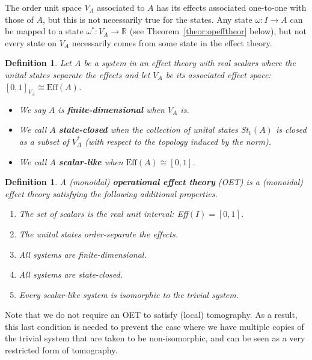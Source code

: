 \documentclass[b5paper,onecolumn,12pt,accepted=2019-05-03, issue=1, volume=1, shorttitle=papers/compositionality-1-1]{compositionalityarticle}
\newcounter{counter}
\numberwithin{counter}{section}
\newtheorem{definition}[counter]{Definition}
\newcommand{\R}{\mathbb{R}}
\newcommand{\pred}{\text{Eff}}
\begin{document}
The order unit space $V_A$ associated to $A$ has its effects associated one-to-one with those of $A$, but this is not necessarily true for the states. Any state $\omega:I\rightarrow A$ can be mapped to a state $\omega^*:V_A\rightarrow \R$ (see Theorem~\ref{theor:opefftheor} below), but not every state on $V_A$ necessarily comes from some state in the effect theory.

\begin{definition}
    Let $A$ be a system in an effect theory with real scalars where the unital states separate the effects and let $V_A$ be its associated effect space: $[0,1]_{V_A} \cong \pred(A)$.
    \begin{itemize}
    \item We say $A$ is \textbf{finite-dimensional} when $V_A$ is.
    \item We call $A$ \textbf{state-closed} when the collection of unital states St$_1(A)$ is closed as a subset of $V_A^*$ (with respect to the topology induced by the norm). 
    \item We call $A$ \textbf{scalar-like} when $\pred(A) \cong [0,1]$.
    \end{itemize}
\end{definition}

\begin{definition}
    A (monoidal) \textbf{operational effect theory} (OET) is a (monoidal) effect theory satisfying the following additional properties.
    \begin{enumerate}
        \item The set of scalars is the real unit interval: Eff$(I)=[0,1]$.
        \item The unital states order-separate the effects.
        \item All systems are finite-dimensional.
        \item All systems are state-closed.
        \item Every scalar-like system is isomorphic to the trivial system.
    \end{enumerate}
\end{definition}
Note that we do not require an OET to satisfy (local) tomography. As a result, this last condition is needed to prevent the case where we have multiple copies of the trivial system that are taken to be non-isomorphic, and can be seen as a very restricted form of tomography.
\end{document}
